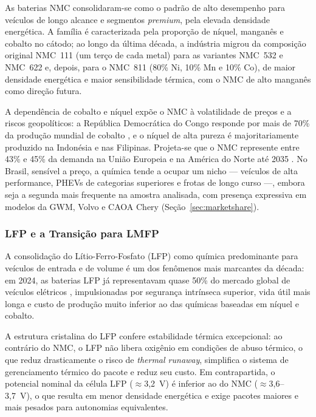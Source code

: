 As baterias NMC consolidaram-se como o padrão de alto desempenho para veículos de
longo alcance e segmentos \textit{premium}, pela elevada densidade energética. A
família é caracterizada pela proporção de níquel, manganês e cobalto no cátodo; ao
longo da última década, a indústria migrou da composição original NMC~111 (um
terço de cada metal) para as variantes NMC~532 e NMC~622 e, depois, para o
NMC~811 (80\% Ni, 10\% Mn e 10\% Co), de maior densidade energética e maior
sensibilidade térmica, com o NMC de alto manganês como direção futura.

A dependência de cobalto e níquel expõe o NMC à volatilidade de preços e a riscos
geopolíticos: a República Democrática do Congo responde por mais de 70\% da
produção mundial de cobalto \cite{IEA2025}, e o níquel de alta pureza é
majoritariamente produzido na Indonésia e nas Filipinas. Projeta-se que o NMC
represente entre 43\% e 45\% da demanda na União Europeia e na América do Norte
até 2035 \cite{McKinsey2026}. No Brasil, sensível a preço, a química tende a
ocupar um nicho — veículos de alta performance, PHEVs de categorias superiores e
frotas de longo curso —, embora seja a segunda mais frequente na amostra
analisada, com presença expressiva em modelos da GWM, Volvo e CAOA Chery
(Seção~\ref{sec:marketshare}).

\subsubsection{LFP e a Transição para LMFP}
\label{subsec:lfp}

A consolidação do Lítio-Ferro-Fosfato (LFP) como química predominante para
veículos de entrada e de volume é um dos fenômenos mais marcantes da década: em
2024, as baterias LFP já representavam quase 50\% do mercado global de veículos
elétricos \cite{McKinsey2026}, impulsionadas por segurança intrínseca superior,
vida útil mais longa e custo de produção muito inferior ao das químicas baseadas
em níquel e cobalto.

A estrutura cristalina do LFP confere estabilidade térmica excepcional: ao
contrário do NMC, o LFP não libera oxigênio em condições de abuso térmico, o que
reduz drasticamente o risco de \textit{thermal runaway}, simplifica o sistema de
gerenciamento térmico do pacote e reduz seu custo. Em contrapartida, o potencial
nominal da célula LFP ($\approx$3,2~V) é inferior ao do NMC ($\approx$3,6--3,7~V),
o que resulta em menor densidade energética e exige pacotes maiores e mais pesados
para autonomias equivalentes.

